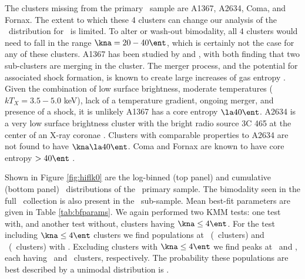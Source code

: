The clusters missing from the primary \hifl\ sample are A1367, A2634,
Coma, and Fornax. The extent to which these 4 clusters can change our
analysis of the \kna\ distribution for \hifl\ is limited.  To alter or
wash-out bimodality, all 4 clusters would need to fall in the range
$\kna = 20-40 \ent$, which is certainly not the case for any of these
clusters. A1367 has been studied by \citet{1998ApJ...500..138D} and
\citet{2002ApJ...576..708S}, with both finding that two sub-clusters
are merging in the cluster. The merger process, and the potential for
associated shock formation, is known to create large increases of gas
entropy \citep{2007MNRAS.376..497M}. Given the combination of low
surface brightness, moderate temperatures ($kT_X = 3.5-5.0$ keV), lack
of a temperature gradient, ongoing merger, and presence of a shock, it
is unlikely A1367 has a core entropy $\la 40 \ent$. A2634 is a very
low surface brightness cluster with the bright radio source 3C 465 at
the center of an X-ray coronae \citep{coronae}. Clusters with
comparable properties to A2634 are not found to have $\kna \la 40
\ent$. Coma and Fornax are known to have core entropy $> 40 \ent$
\citep[][C. Scharf, private communication]{2008arXiv0802.1864R}.

Shown in Figure \ref{fig:hiflk0} are the log-binned (top panel) and
cumulative (bottom panel) \kna\ distributions of the \hifl\ primary
sample. The bimodality seen in the full \accept\ collection is also
present in the \hifl\ sub-sample. Mean best-fit parameters are given
in Table \ref{tab:bfparams}. We again performed two KMM tests: one
test with, and another test without, clusters having $\kna \le 4
\ent$. For the test including $\kna \le 4 \ent$ clusters we find
populations at \hiflkmma\ (\hiflkmmc\ clusters) and \hiflkmmb\
(\hiflkmmd\ clusters) with \hiflkmme. Excluding clusters with $\kna
\le 4 \ent$ we find peaks at \hiflkmmf\ and \hiflkmmg, each having
\hiflkmmh\ and \hiflkmmi\ clusters, respectively. The probability
these populations are best described by a unimodal distribution is
\hiflkmmj.

